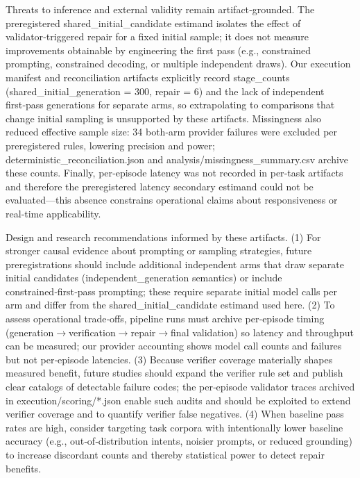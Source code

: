 \documentclass[conference]{IEEEtran}
\begin{document}
Threats to inference and external validity remain artifact‑grounded. The preregistered shared\_initial\_candidate estimand isolates the effect of validator‑triggered repair for a fixed initial sample; it does not measure improvements obtainable by engineering the first pass (e.g., constrained prompting, constrained decoding, or multiple independent draws). Our execution manifest and reconciliation artifacts explicitly record stage\_counts (shared\_initial\_generation = 300, repair = 6) and the lack of independent first‑pass generations for separate arms, so extrapolating to comparisons that change initial sampling is unsupported by these artifacts. Missingness also reduced effective sample size: 34 both‑arm provider failures were excluded per preregistered rules, lowering precision and power; deterministic\_reconciliation.json and analysis/missingness\_summary.csv archive these counts. Finally, per‑episode latency was not recorded in per‑task artifacts and therefore the preregistered latency secondary estimand could not be evaluated---this absence constrains operational claims about responsiveness or real‑time applicability.

Design and research recommendations informed by these artifacts. (1) For stronger causal evidence about prompting or sampling strategies, future preregistrations should include additional independent arms that draw separate initial candidates (independent\_generation semantics) or include constrained‑first‑pass prompting; these require separate initial model calls per arm and differ from the shared\_initial\_candidate estimand used here. (2) To assess operational trade‑offs, pipeline runs must archive per‑episode timing (generation\ensuremath{\rightarrow}verification\ensuremath{\rightarrow}repair\ensuremath{\rightarrow}final validation) so latency and throughput can be measured; our provider accounting shows model call counts and failures but not per‑episode latencies. (3) Because verifier coverage materially shapes measured benefit, future studies should expand the verifier rule set and publish clear catalogs of detectable failure codes; the per‑episode validator traces archived in execution/scoring/*.json enable such audits and should be exploited to extend verifier coverage and to quantify verifier false negatives. (4) When baseline pass rates are high, consider targeting task corpora with intentionally lower baseline accuracy (e.g., out‑of‑distribution intents, noisier prompts, or reduced grounding) to increase discordant counts and thereby statistical power to detect repair benefits.
\end{document}
